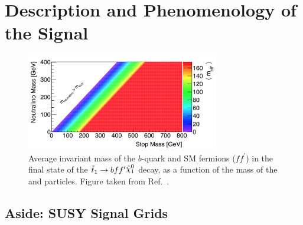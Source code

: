 \section{Description and Phenomenology of the Signal}
\label{sec:stop_pheno}

\begin{figure}[!htb]
    \begin{center}
        \includegraphics[width=0.75\textwidth]{figures/search_stop2l/nachman_stop_phase_space}
        \caption{
            Average invariant mass of the $b$-quark and SM fermions ($f f^{\prime}$) in the
            final state of the $\stopone \rightarrow b f f^{\prime} \ninoone$ decay, as a function of the mass
            of the \stopone and \ninoone particles.
            Figure taken from Ref.~\cite{Nachman:2016qyc}.
        }
        \label{fig:stop_phase_space}
    \end{center}
\end{figure}



\subsection{Aside: SUSY Signal Grids}
\label{sec:susy_signal_grid}

